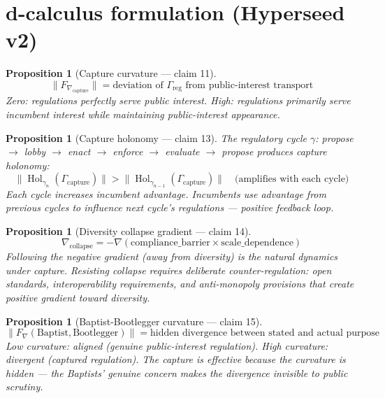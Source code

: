 \documentclass[11pt,a4paper]{article}
\newtheorem{proposition}[definition]{Proposition}
\begin{document}
\section{d-calculus formulation (Hyperseed v2)}

\begin{proposition}[Capture curvature --- claim 11]
\label{prop:capture}
\[
  \|F_{\nabla_{\text{capture}}}\| = \text{deviation of }
    \Gamma_{\text{reg}} \text{ from public-interest transport}
\]
Zero: regulations perfectly serve public interest. High: regulations
primarily serve incumbent interest while maintaining public-interest
appearance.
\end{proposition}

\begin{proposition}[Capture holonomy --- claim 13]
\label{prop:holonomy}
The regulatory cycle $\gamma$: propose $\to$ lobby $\to$ enact $\to$
enforce $\to$ evaluate $\to$ propose produces capture holonomy:
\[
  \|\operatorname{Hol}_{\gamma_n}(\Gamma_{\text{capture}})\| >
  \|\operatorname{Hol}_{\gamma_{n-1}}(\Gamma_{\text{capture}})\|
  \quad \text{(amplifies with each cycle)}
\]
Each cycle increases incumbent advantage. Incumbents use advantage from
previous cycles to influence next cycle's regulations --- positive
feedback loop.
\end{proposition}

\begin{proposition}[Diversity collapse gradient --- claim 14]
\label{prop:gradient}
\[
  \nabla_{\text{collapse}} = -\nabla(\text{compliance\_barrier} \times
    \text{scale\_dependence})
\]
Following the negative gradient (away from diversity) is the natural
dynamics under capture. Resisting collapse requires deliberate
counter-regulation: open standards, interoperability requirements,
and anti-monopoly provisions that create positive gradient toward
diversity.
\end{proposition}

\begin{proposition}[Baptist-Bootlegger curvature --- claim 15]
\label{prop:bb}
\[
  \|F_\nabla(\text{Baptist}, \text{Bootlegger})\| =
    \text{hidden divergence between stated and actual purpose}
\]
Low curvature: aligned (genuine public-interest regulation). High
curvature: divergent (captured regulation). The capture is effective
\emph{because} the curvature is hidden --- the Baptists' genuine
concern makes the divergence invisible to public scrutiny.
\end{proposition}
\end{document}

